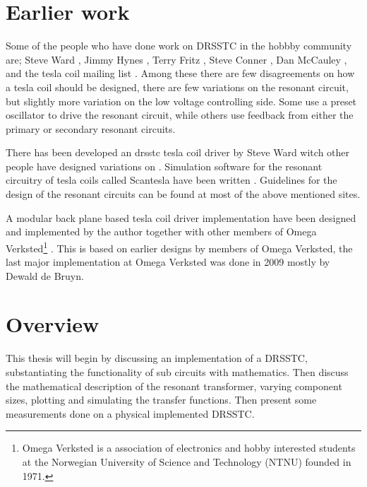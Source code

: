\section{Earlier work}
Some of the people who have done work on DRSSTC in the hobbby community are; Steve Ward , Jimmy Hynes , Terry Fritz , Steve Conner , Dan McCauley , and the tesla coil mailing list . Among these there are few disagreements on how a tesla coil should be designed, there are few variations on the resonant circuit, but slightly more variation on the low voltage controlling side. Some use a preset oscillator to drive the resonant circuit, while others use feedback from either the primary or secondary resonant circuits.

There has been developed an drsstc tesla coil driver by Steve Ward witch other people have designed variations on .
Simulation software for the resonant circuitry of tesla coils called Scantesla have been written .
Guidelines for the design of the resonant circuits can be found at most of the above mentioned sites.

A modular back plane based tesla coil driver implementation have been designed and implemented by the author together with other members of Omega Verksted\footnote{Omega Verksted is a association of electronics and hobby interested students at the Norwegian University of Science and Technology (NTNU) founded in 1971.} \citep{prosjektoppgave} \citep{githubtesla}. This is based on earlier designs by members of Omega Verksted, the last major implementation at Omega Verksted was done in 2009 mostly by Dewald de Bruyn.



\section{Overview}
This thesis will begin by discussing an implementation of a DRSSTC, substantiating the functionality of sub circuits with mathematics. Then discuss the mathematical description of the resonant transformer, varying component sizes, plotting and simulating the transfer functions. Then present some measurements done on a physical implemented DRSSTC.